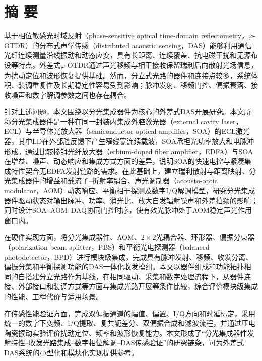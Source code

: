 \frontmatter {}  %

\chapter*{摘\texorpdfstring{\qquad}{} 要}
\thispagestyle{main}

基于相位敏感光时域反射（phase-sensitive optical time-domain reflectometry，$\varphi$-OTDR）的分布式声学传感（distributed acoustic sensing，DAS）能够利用通信光纤连续测量沿线振动和动态应变，具有长距离、连续覆盖、抗电磁干扰和无源布设等特点。外差式$\varphi$-OTDR通过声光移频与相干接收保留瑞利后向散射光场信息，为扰动定位和波形恢复提供基础。然而，分立式光路的器件和连接点较多，系统体积、装调重复性及长期稳定性容易受到影响；脉冲发射、移频门控、偏振衰落、接收噪声和数字解调参数之间也存在耦合。

针对上述问题，本文围绕以分光集成器件为核心的外差式DAS开展研究。本文所称分光集成器件是一种在同一封装内集成外腔激光器（external cavity laser，ECL）与半导体光放大器（semiconductor optical amplifier，SOA）的ECL激光器，其中LD在外部腔反馈下产生窄线宽连续载波，SOA承担光功率放大和电脉冲形成。通过比较掺铒光纤放大器（erbium-doped fiber amplifier，EDFA）与SOA在增益、噪声、动态响应和集成方式方面的差异，说明SOA的快速电控与紧凑集成特性契合无EDFA发射链路的需求。在此基础上，建立瑞利散射与距离映射、分光集成器件的增益和载流子--折射率耦合、声光调制器（acousto-optic modulator，AOM）动态响应、平衡相干探测及数字I/Q解调模型，研究分光集成器件驱动状态对输出脉冲、功率、消光比、放大自发辐射噪声和外差拍频的影响；同时设计SOA--AOM--DAQ协同门控时序，使有效光脉冲处于AOM稳定声光作用窗口内。

在硬件实现方面，将分光集成器件、AOM、$2\times2$光耦合器、环形器、偏振分束器（polarization beam splitter，PBS）和平衡光电探测器（balanced photodetector，BPD）进行模块级集成，完成具有脉冲发射、移频、收发分离、偏振分集和平衡探测功能的DAS一体化收发模组。本文以器件组成和功能拓扑相同的自搭建分立光路作为基线，在相同驱动、采集和数字处理流程下，从器件连接、外部接口和装调方式等方面与集成光路开展等条件比较，综合评价模块级集成的性能、工程代价与适用场景。

在传感性能验证方面，完成双偏振通道的幅值、偏置、I/Q方向和时延标定，采用统一的数字下变频、I/Q提取、复共轭差分、双偏振合成和滤波流程，并通过压电陶瓷振动实验评价扰动定位、频率和波形恢复能力。本文形成了“分光集成器件发射特性--收发光路集成--数字相位解调--DAS传感验证”的研究链条，可为外差式DAS系统的小型化和模块化实现提供参考。

